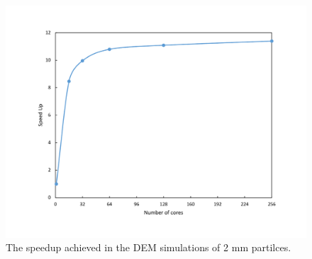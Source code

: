 \documentclass[preprint,11pt,authoryear]{elsarticle}
\begin{document}
\begin{figure}[H]
\centering
\includegraphics[scale=0.5]{rslts_DEM_speedup.pdf}
\caption{The speedup achieved in the DEM simulations of 2 mm partilces.}
\label{fig:rslts_DEM_speedup}
\end{figure}
\end{document}
